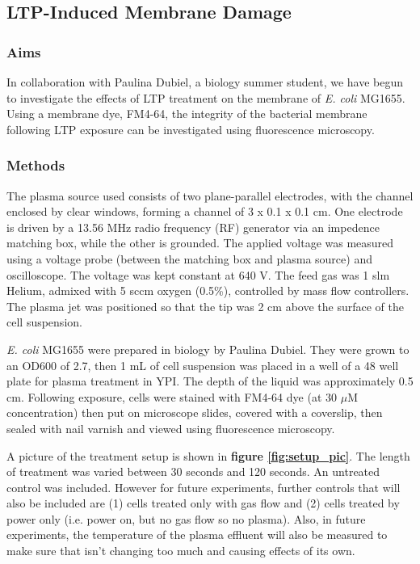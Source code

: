 \documentclass[11pt, oneside]{article}   	%
\begin{document}
\subsection{LTP-Induced Membrane Damage}

\subsubsection{Aims}
In collaboration with Paulina Dubiel, a biology summer student, we have begun to investigate the effects of LTP treatment on the membrane of \textit{E. coli} MG1655.
Using a membrane dye, FM4-64, the integrity of the bacterial membrane following LTP exposure can be investigated using fluorescence microscopy.

\subsubsection{Methods}

The plasma source used consists of two plane-parallel electrodes, with the channel enclosed by clear windows, forming a channel of 3 x 0.1 x 0.1 cm. 
One electrode is driven by a 13.56 MHz radio frequency (RF) generator via an impedence matching box, while the other is grounded. 
The applied voltage was measured using a voltage probe (between the matching box and plasma source) and oscilloscope.
The voltage was kept constant at 640 V.
The feed gas was 1 slm Helium, admixed with 5 sccm oxygen (0.5\%), controlled by mass flow controllers. 
The plasma jet was positioned so that the tip was 2 cm above the surface of the cell suspension.

\textit{E. coli} MG1655 were prepared in biology by Paulina Dubiel. 
They were grown to an OD600 of 2.7, then 1 mL of cell suspension was placed in a well of a 48 well plate for plasma treatment in YPI.
The depth of the liquid was approximately 0.5 cm.
Following exposure, cells were stained with FM4-64 dye (at 30 $\mu$M concentration) then put on microscope slides, covered with a coverslip, then sealed with nail varnish and viewed using fluorescence microscopy.

A picture of the treatment setup is shown in \textbf{figure \ref{fig:setup_pic}}.
The length of treatment was varied between 30 seconds and 120 seconds.
An untreated control was included. 
However for future experiments, further controls that will also be included are (1) cells treated only with gas flow and (2)
cells treated by power only (i.e. power on, but no gas flow so no plasma).
Also, in future experiments, the temperature of the plasma effluent will also be measured to make sure that isn't changing too much and causing effects of its own.
\end{document}

